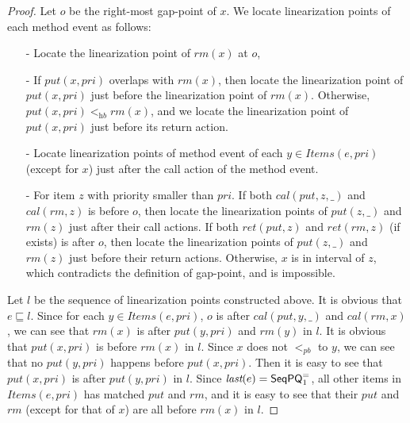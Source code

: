 \begin {proof}

Let $o$ be the right-most gap-point of $x$. We locate linearization points of each method event as follows:

\begin{itemize}
\setlength{\itemsep}{0.5pt}
\item[-] Locate the linearization point of $\textit{rm}(x)$ at $o$,

\item[-] If $\textit{put}(x,\textit{pri})$ overlaps with $\textit{rm}(x)$, then locate the linearization point of $\textit{put}(x,\textit{pri})$ just before the linearization point of $\textit{rm}(x)$. Otherwise, $\textit{put}(x,\textit{pri}) <_{\textit{hb}} \textit{rm}(x)$, and we locate the linearization point of $\textit{put}(x,\textit{pri})$ just before its return action.

\item[-] Locate linearization points of method event of each $y \in \textit{Items}(e,\textit{pri})$ (except for $x$) just after the call action of the method event.

\item[-] For item $z$ with priority smaller than $\textit{pri}$. If both $\textit{cal}(\textit{put},z,\_)$ and $\textit{cal}(\textit{rm},z)$ is before $o$, then locate the linearization points of $\textit{put}(z,\_)$ and $\textit{rm}(z)$ just after their call actions. If both $\textit{ret}(\textit{put},z)$ and $\textit{ret}(\textit{rm},z)$ (if exists) is after $o$, then locate the linearization points of $\textit{put}(z,\_)$ and $\textit{rm}(z)$ just before their return actions. Otherwise, $x$ is in interval of $z$, which contradicts the definition of gap-point, and is impossible.
\end{itemize}

Let $l$ be the sequence of linearization points constructed above. It is obvious that $e \sqsubseteq l$. Since for each $y \in \textit{Items}(e,\textit{pri})$, $o$ is after $\textit{cal}(\textit{put},y,\_)$ and $\textit{cal}(\textit{rm},x)$, we can see that $\textit{rm}(x)$ is after $\textit{put}(y,\textit{pri})$ and $\textit{rm}(y)$ in $l$. It is obvious that $\textit{put}(x,\textit{pri})$ is before $\textit{rm}(x)$ in $l$. Since $x$ does not $<_{\textit{pb}}$ to $y$, we can see that no $\textit{put}(y,\textit{pri})$ happens before $\textit{put}(x,\textit{pri})$. Then it is easy to see that $\textit{put}(x,\textit{pri})$ is after $\textit{put}(y,\textit{pri})$ in $l$. Since $\textit{last}(e) = \mathsf{SeqPQ}_1^{=}$, all other items in $\textit{Items}(e,\textit{pri})$ has matched $\textit{put}$ and $\textit{rm}$, and it is easy to see that their $\textit{put}$ and $\textit{rm}$ (except for that of $x$) are all before $\textit{rm}(x)$ in $l$.


\end{proof}
